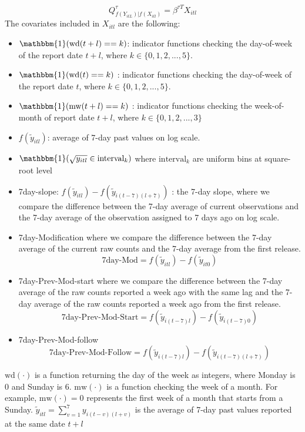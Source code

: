 $$Q_{f(Y_{itL})|f(X_{itl})}^{\tau}= \beta^{\tau T}X_{itl}$$
The covariates included in $X_{itl}$ are the following:
\begin{itemize}
    \item $\mathbbm{1}(\mbox{wd}(t+l) == k)$: indicator functions checking the day-of-week of the report date $t+l$, where $k \in \{0, 1, 2, ..., 5\}$. 
    \item $\mathbbm{1}(\mbox{wd}(t) == k)$ : indicator functions checking the day-of-week of the report date $t$, where $k \in \{0, 1, 2, ..., 5\}$.
    \item $\mathbbm{1}(\mbox{mw}(t+l) == k)$ : indicator functions checking the week-of-month of report date $t+l$, where $k \in \{0, 1, 2, ...,3\}$
    \item $f(\widetilde{y}_{itl})$: average of 7-day past values on log scale.
    \item $\mathbbm{1}(\sqrt{y_{itl}} \in \mbox{interval}_k)$ where $\mbox{interval}_k$ are uniform bins at square-root level
    \item \mbox{7day-slope}: $f(\widetilde{y}_{itl}) - f(\widetilde{y}_{i(t-7)(l+7)})$ : the 7-day slope, where we compare the difference between the 7-day average of current observations and the 7-day average of the observation assigned to 7 days ago on log scale.
    \item 7day-Modification where we compare the difference between the 7-day average of the current raw counts and the 7-day average from the first release. 
    $$\mbox{7day-Mod} = f( \widetilde{y}_{itl}) - f(\widetilde{y}_{it0})$$
    \item 7day-Prev-Mod-start where we compare the difference between the 7-day average of the raw counts reported a week ago with the same lag and the 7-day average of the raw counts reported a week ago from the first release. 
    $$\mbox{7day-Prev-Mod-Start} = f( \widetilde{y}_{i(t-7)l}) - f(\widetilde{y}_{i(t-7)0})$$
    \item 7day-Prev-Mod-follow 
    $$\mbox{7day-Prev-Mod-Follow} = f(\widetilde{y}_{i(t-7)l}) - f( \widetilde{y}_{i(t-7)(l+7)})$$

\end{itemize}
$\mbox{wd}(\cdot)$ is a function returning the day of the week as integers, where Monday is 0 and Sunday is 6. $\mbox{mw}(\cdot)$ is a function checking the week of a month. For example, $\mbox{mw}(\cdot) = 0$ represents the first week of a month that starts from a Sunday. $\widetilde{y}_{itl} = \sum_{v=1}^7 y_{i(t-v)(l+v)}$ is the average of 7-day past values reported at the same date $t+l$

